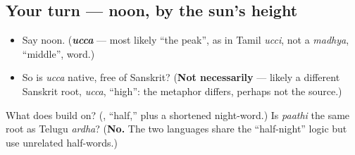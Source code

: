 \subsection*{Your turn — noon, by the sun's height}
\begin{itemize}
\raggedright
  \item Say noon. (\emph{\textbf{ucca}} — most likely \textquotedblleft{}the peak\textquotedblright{}, as in Tamil \emph{ucci}, not a \emph{madhya}, \textquotedblleft{}middle\textquotedblright{}, word.)
  \item So is \emph{ucca} native, free of Sanskrit? (\textbf{Not necessarily} — likely a different Sanskrit root, \emph{ucca}, \textquotedblleft{}high\textquotedblright{}: the metaphor differs, perhaps not the source.)
\end{itemize}

\begin{tcolorbox}[breakable,colback=teal!4,colframe=teal!35!black,title={Before you move on}]
What does \textbf{} build on? (\textbf{}, “half,” plus a shortened night-word.) Is \emph{paathi} the same root as Telugu \emph{ardha}? (\textbf{No.} The two languages share the “half-night” logic but use unrelated half-words.)
\end{tcolorbox}
